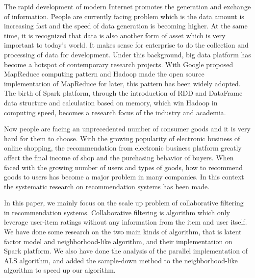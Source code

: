 %
%
\begin{enabstract}
The rapid development of modern Internet promotes the generation and exchange of information. People are currently facing problem which is the data amount is increasing fast and the speed of data generation is becoming higher.  At the same time, it is recognized that data is also another form of asset which is very important to today's world. It makes sense for enterprise to do the collection and processing of data for development. Under this background, big data platform has become a hotspot of contemporary research projects. With Google proposed MapReduce computing pattern and Hadoop made the open source implementation of MapReduce for later, this pattern has been widely adopted. The birth of Spark platform, through the introduction of RDD and DataFrame data structure and calculation based on memory, which win Hadoop in computing speed, becomes a research focus of the industry and academia.
    
Now people are facing an unprecedented number of consumer goods and it is very hard for them to choose. With the growing popularity of electronic business of online shopping, the recommendation from electronic business platform greatly affect the final income of shop and the purchasing behavior of buyers. When faced with the growing number of users and types of goods, how to recommend goods to users has become a major problem in many companies. In this context the systematic research on recommendation systems has been made.

    In this paper, we mainly focus on the scale up problem of collaborative filtering in recommendation systems. Collaborative filtering is algorithm which only leverage user-item ratings without any information from the item and user itself. We have done some research on the two main kinds of algorithm, that is latent factor model and neighborhood-like algorithm, and their implementation on Spark platform. We also have done the analysis of the parallel implementation of ALS algorithm, and added the sample-down method to the neighborhood-like algorithm to speed up our algorithm.
\end{enabstract}
